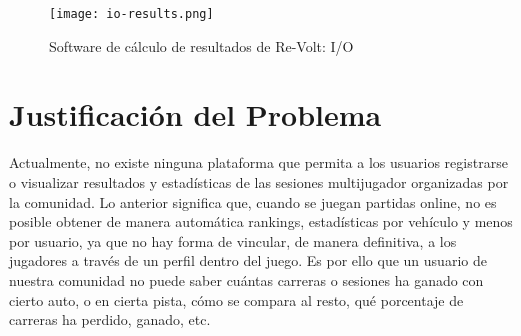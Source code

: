\begin{figure}[H]
  \begin{center}
    \texttt{[image: io-results.png]}
  \end{center}
  \caption[Software de cálculo de resultados de Re-Volt: I/O]{Software de cálculo de resultados de Re-Volt: I/O}
  \label{fig:io-results}
\end{figure}

\section{Justificación del Problema}
Actualmente, no existe ninguna plataforma que permita a los usuarios registrarse o visualizar resultados y estadísticas de las sesiones multijugador organizadas por la comunidad. Lo anterior significa que, cuando se juegan partidas online, no es posible obtener de manera automática rankings, estadísticas por vehículo y menos por usuario, ya que no hay forma de vincular, de manera definitiva, a los jugadores a través de un perfil dentro del juego. Es por ello que un usuario de nuestra comunidad no puede saber cuántas carreras o sesiones ha ganado con cierto auto, o en cierta pista, cómo se compara al resto, qué porcentaje de carreras ha perdido, ganado, etc.
